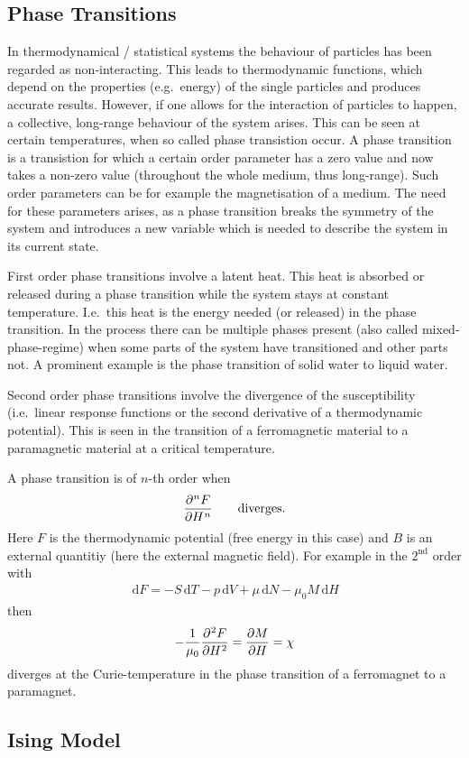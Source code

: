 \documentclass[a4paper,10pt]{article}
\newcommand{\td}{\,\text{d}}
\numberwithin{equation}{section}
\begin{document}
\begin{multicols}{2}
\section{Phase Transitions}
In thermodynamical / statistical systems the behaviour of particles has been regarded as non-interacting.
This leads to thermodynamic functions, which depend on the properties (e.g.\ energy) of the single particles and produces accurate results.
However, if one allows for the interaction of particles to happen, a collective, long-range behaviour of the system arises.
This can be seen at certain temperatures, when so called phase transistion occur.
A phase transition is a transistion for which a certain order parameter has a zero value and now takes a non-zero value (throughout the whole medium, thus long-range).
Such order parameters can be for example the magnetisation of a medium.
The need for these parameters arises, as a phase transition breaks the symmetry of the system and introduces a new variable which is needed to describe the system in its current state.

First order phase transitions involve a latent heat.
This heat is absorbed or released during a phase transition while the system stays at constant temperature.
I.e.\ this heat is the energy needed (or released) in the phase transition.
In the process there can be multiple phases present (also called mixed-phase-regime) when some parts of the system have transitioned and other parts not.
A prominent example is the phase transition of solid water to liquid water.

Second order phase transitions involve the divergence of the susceptibility (i.e.\ linear response functions or the second derivative of a thermodynamic potential).
This is seen in the transition of a ferromagnetic material to a paramagnetic material at a critical temperature.

A phase transition is of $n$-th order when 
\begin{align} 
  \diffp[n]{F}{H}\qquad \text{diverges}
.\end{align} 
Here $F$ is the thermodynamic potential (free energy in this case) and $B$ is an external quantitiy (here the external magnetic field).
For example in the $2^\text{nd}$ order with 
\begin{align} 
  \td F=-S\td T-p\td V+\mu \td N-\mu _0M\td H
\end{align} 
then
\begin{align} 
  -\dfrac{1}{\mu _0}\diffp[2]{F}{H}=\diffp[]{M}{H}=\chi 
\end{align} 
diverges at the Curie-temperature in the phase transition of a ferromagnet to a paramagnet.

\subsection{Ising Model}



\end{multicols}

%
%
\end{document}
